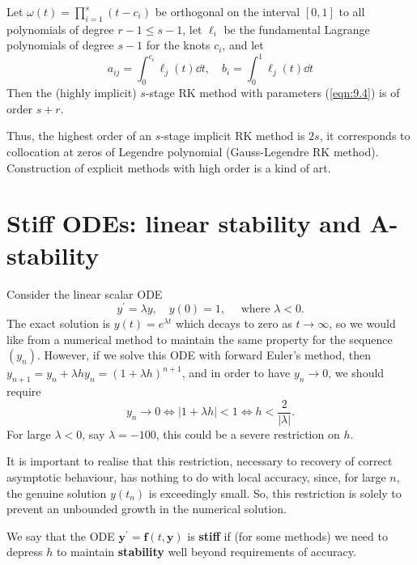 \documentclass[a4paper]{article}
\begin{document}
\begin{theorem}
    Let $\omega(t)=\prod_{i=1}^s\left(t-c_i\right)$ be orthogonal on the interval $[0,1]$ to all polynomials of degree $r-1 \leq s-1$, let $\ell_i$ be the fundamental Lagrange polynomials of degree $s-1$ for the knots $c_i$, and let
\begin{equation}\label{eqn:9.4}
    a_{i j}=\int_0^{c_i} \ell_j(t) \dd{t}, \quad b_i=\int_0^1 \ell_j(t) \dd{t}
\end{equation}
Then the (highly implicit) $s$-stage RK method with parameters (\ref{eqn:9.4}) is of order $s+r$. 
\end{theorem}
Thus, the highest order of an $s$-stage implicit RK method is $2 s$, it corresponds to collocation at zeros of Legendre polynomial (Gauss-Legendre RK method). Construction of explicit methods with high order is a kind of art.

\section{Stiff ODEs: linear stability and A-stability}

Consider the linear scalar ODE
\[
y^{\prime}=\lambda y, \quad y(0)=1, \quad \text { where } \lambda<0 .
\]
The exact solution is $y(t)=e^{\lambda t}$ which decays to zero as $t \rightarrow \infty$, so we would like from a numerical method to maintain the same property for the sequence $\left(y_n\right)$. However, if we solve this ODE with forward Euler's method, then $y_{n+1}=y_n+\lambda h y_n=(1+\lambda h)^{n+1}$, and in order to have $y_n \rightarrow 0$, we should require
\[
y_n \rightarrow 0 \Leftrightarrow|1+\lambda h|<1 \Leftrightarrow h<\frac{2}{|\lambda|} .
\]
For large $\lambda<0$, say $\lambda=-100$, this could be a severe restriction on $h$.

It is important to realise that this restriction, necessary to recovery of correct asymptotic behaviour, has nothing to do with local accuracy, since, for large $n$, the genuine solution $y\left(t_n\right)$ is exceedingly small. So, this restriction is solely to prevent an unbounded growth in the numerical solution.

\begin{definition}
    We say that the ODE $\mathbf{y}^{\prime}=\mathbf{f}(t, \mathbf{y})$ is \textbf{stiff} if (for some methods) we need to depress $h$ to maintain \textbf{stability} well beyond requirements of accuracy.
\end{definition}
\end{document}
